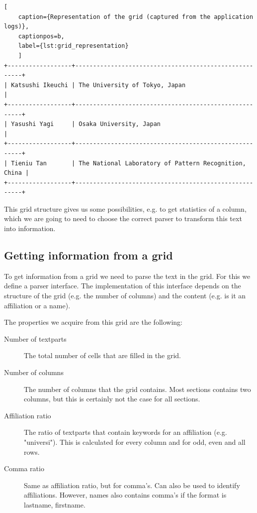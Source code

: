 \documentclass{ou-report}
\begin{document}
\begin{lstlisting}[
    caption={Representation of the grid (captured from the application logs)},
    captionpos=b,
    label={lst:grid_representation}
    ]
+------------------+-------------------------------------------------------+
| Katsushi Ikeuchi | The University of Tokyo, Japan                        |
+------------------+-------------------------------------------------------+
| Yasushi Yagi     | Osaka University, Japan                               |
+------------------+-------------------------------------------------------+
| Tieniu Tan       | The National Laboratory of Pattern Recognition, China |
+------------------+-------------------------------------------------------+
\end{lstlisting}

This grid structure gives us some possibilities, e.g. to get statistics of a
column, which we are going to need to choose the correct parser to transform
this text into information.

\subsection{Getting information from a grid}
\label{subsec:front_matter_grid_information}
To get information from a grid we need to parse the text in the grid. For 
this we define a parser interface. The implementation of this interface 
depends on the structure of the grid (e.g. the number of columns) and the 
content (e.g. is it an affiliation or a name).

The properties we acquire from this grid are the following:
\begin{description}
    \item[Number of textparts] The total number of cells that are filled in
        the grid.
    \item[Number of columns] The number of columns that the grid contains.
        Most sections contains two columns, but this is certainly not the 
        case for all sections.
    \item[Affiliation ratio] The ratio of textparts that contain keywords 
        for an affiliation (e.g. "universi"). This is calculated for every 
        column and for odd, even and all rows.
    \item[Comma ratio] Same as affiliation ratio, but for comma's. Can also
        be used to identify affiliations. However, names also contains 
        comma's if the format is lastname, firstname.
\end{description}
\end{document}
